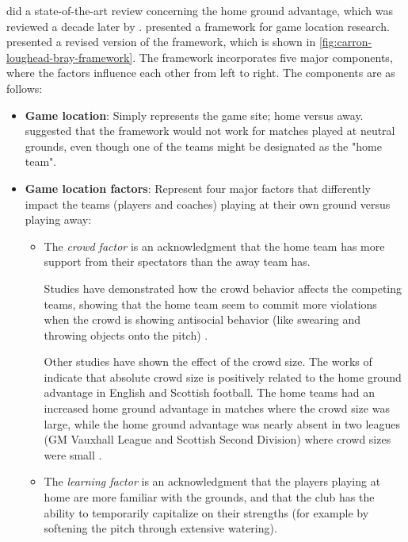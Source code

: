\citet{bib:courneya-carron-1992} did a state-of-the-art review concerning the home ground advantage, which was reviewed a decade later by \citet{bib:carron-loughead-bray-2005}. \citet{bib:courneya-carron-1992} presented a framework for game location research. \citet{bib:carron-loughead-bray-2005} presented a revised version of the framework, which is shown in \cref{fig:carron-loughead-bray-framework}. The framework incorporates five major components, where the factors influence each other from left to right. The components are as follows:
\begin{itemize}
    \item \textbf{Game location}: Simply represents the game site; home versus away. \citet{bib:courneya-carron-1992} suggested that the framework would not work for matches played at neutral grounds, even though one of the teams might be designated as the "home team".
    
    \item \textbf{Game location factors}: Represent four major factors that differently impact the teams (players and coaches) playing at their own ground versus playing away:
    
    \begin{itemize}
        \item The \textit{crowd factor} is an acknowledgment that the home team has more support from their spectators than the away team has.
        
        Studies have demonstrated how the crowd behavior affects the competing teams, showing that the home team seem to commit more violations when the crowd is showing antisocial behavior (like swearing and throwing objects onto the pitch) \citep{bib:carron-loughead-bray-2005}.
        
        Other studies have shown the effect of the crowd size. The works of \citet{bib:nevill-newell-gale-1996} indicate that absolute crowd size is positively related to the home ground advantage in English and Scottish football. The home teams had an increased home ground advantage in matches where the crowd size was large, while the home ground advantage was nearly absent in two leagues (GM Vauxhall League and Scottish Second Division) where crowd sizes were small \citep{bib:nevill-newell-gale-1996}.
        
        \item The \textit{learning factor} is an acknowledgment that the players playing at home are more familiar with the grounds, and that the club has the ability to temporarily capitalize on their strengths (for example by softening the pitch through extensive watering).
        

\end{itemize}
\end{itemize}
